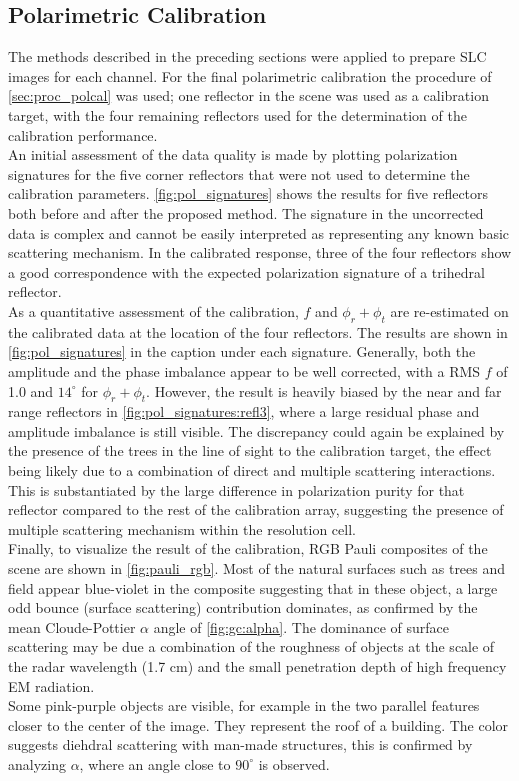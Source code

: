 \subsection{Polarimetric Calibration}\label{sec:res_polcal}
The methods described in the preceding sections were applied to prepare SLC images for each channel. For the final polarimetric calibration the procedure of \autoref{sec:proc_polcal} was used; one reflector in the scene was used as a calibration target, with the four remaining reflectors used for the determination of the calibration performance.\\
An initial assessment of the data quality is made by plotting polarization signatures\cite{VanZyl1987} for the  five corner reflectors that were not used to determine the calibration parameters. \autoref{fig:pol_signatures} shows the results for five reflectors both before and after the proposed method.
The signature in the uncorrected data is complex and cannot be easily interpreted as representing any known basic scattering mechanism. In the calibrated response, three of the four reflectors show a good correspondence with the expected polarization signature of a trihedral reflector.\\
As a quantitative assessment of the calibration,  $f$ and $\phi_r + \phi_t$ are re-estimated on the calibrated data at the location of the four reflectors. The results are shown in \autoref{fig:pol_signatures} in the caption under each signature. Generally, both the amplitude and the phase imbalance appear to be well corrected, with a RMS $f$ of 1.0 and $14^\circ$ for $\phi_r + \phi_t$. However, the result is heavily biased by the near and far range reflectors in \autoref{fig:pol_signatures:refl3}, where a large residual phase and amplitude imbalance is still visible. The discrepancy could again be explained by the presence of the trees in the line of sight to the calibration target, the effect being likely due to a combination of  direct and multiple scattering interactions. This is substantiated by the large difference in polarization purity for that reflector compared to the rest of the calibration array, suggesting the presence of multiple scattering mechanism within the resolution cell.\\
Finally, to visualize the result of the calibration, RGB Pauli composites of the scene are shown in \autoref{fig:pauli_rgb}. Most of the natural surfaces such as trees and field appear blue-violet in the composite suggesting that in these object, a large odd bounce (surface scattering) contribution dominates, as confirmed by the mean Cloude-Pottier $\alpha$ angle of \autoref{fig:gc:alpha}. The dominance of surface scattering may be due a combination of the roughness of objects at the scale of the radar wavelength (1.7 cm) and the small penetration depth of high frequency EM radiation.\\ Some pink-purple objects are visible, for example in the two parallel features closer to the center of the image. They represent the roof of a building. The color suggests diehdral scattering with man-made structures, this is confirmed by analyzing $\alpha$, where an angle close to $90^\circ$ is observed.\\ 
